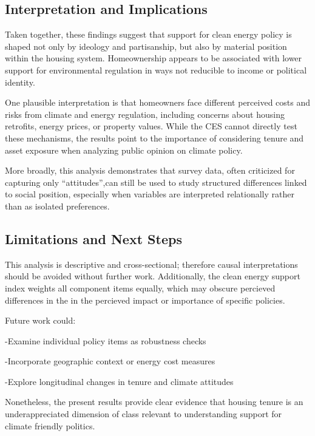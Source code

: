 \documentclass[
  letterpaper,
  DIV=11,
  numbers=noendperiod]{scrartcl}
\begin{document}
\subsection{Interpretation and
Implications}\label{interpretation-and-implications}

Taken together, these findings suggest that support for clean energy
policy is shaped not only by ideology and partisanship, but also by
material position within the housing system. Homeownership appears to be
associated with lower support for environmental regulation in ways not
reducible to income or political identity.

One plausible interpretation is that homeowners face different perceived
costs and risks from climate and energy regulation, including concerns
about housing retrofits, energy prices, or property values. While the
CES cannot directly test these mechanisms, the results point to the
importance of considering tenure and asset exposure when analyzing
public opinion on climate policy.

More broadly, this analysis demonstrates that survey data, often
criticized for capturing only ``attitudes'',can still be used to study
structured differences linked to social position, especially when
variables are interpreted relationally rather than as isolated
preferences.

\subsection{Limitations and Next
Steps}\label{limitations-and-next-steps}

This analysis is descriptive and cross-sectional; therefore causal
interpretations should be avoided without further work. Additionally,
the clean energy support index weights all component items equally,
which may obscure percieved differences in the in the percieved impact
or importance of specific policies.

Future work could:

-Examine individual policy items as robustness checks

-Incorporate geographic context or energy cost measures

-Explore longitudinal changes in tenure and climate attitudes

Nonetheless, the present results provide clear evidence that housing
tenure is an underappreciated dimension of class relevant to
understanding support for climate friendly politics.
\end{document}
